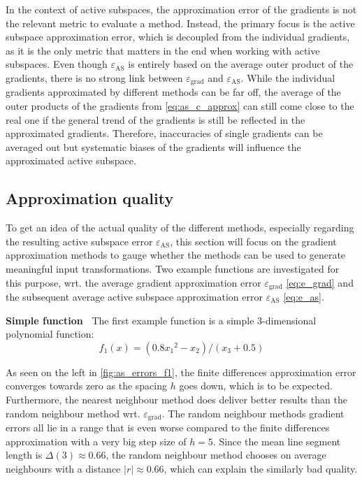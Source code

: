 \documentclass[
  a4paper,  %
  twoside,  %
  bibliography=totoc,
  headsepline,
  cleardoublepage=empty,
  parskip=half,
  draft=false
]{scrbook}
\begin{document}
In the context of active subspaces, the approximation error of the gradients is not the relevant metric to evaluate a method.
Instead, the primary focus is the active subspace approximation error, which is decoupled from the individual gradients, as it is the only metric that matters in the end when working with active subspaces.
Even though $\varepsilon_{\text{AS}}$ is entirely based on the average outer product of the gradients, there is no strong link between $\varepsilon_{\text{grad}}$ and $\varepsilon_{\text{AS}}$.
While the individual gradients approximated by different methods can be far off, the average of the outer products of the gradients from \cref{eq:as_c_approx} can still come close to the real one if the general trend of the gradients is still be reflected in the approximated gradients.
Therefore, inaccuracies of single gradients can be averaged out but systematic biases of the gradients will influence the approximated active subspace.

\subsection{Approximation quality}

To get an idea of the actual quality of the different methods, especially regarding the resulting active subspace error $\varepsilon_{\text{AS}}$, this section will focus on the gradient approximation methods to gauge whether the methods can be used to generate meaningful input transformations.
Two example functions are investigated for this purpose, wrt. the average gradient approximation error $\varepsilon_{\text{grad}}$ \cref{eq:e_grad} and the subsequent average active subspace approximation error $\varepsilon_{\text{AS}}$ \cref{eq:e_as}.

\vspace{2mm}
\textbf{Simple function~}
The first example function is a simple $3$-dimensional polynomial function:
\begin{equation}
f_1(x)=(0.8 {x_1}^2 - x_2) / (x_3 + 0.5)
\nonumber
\end{equation}

As seen on the left in \cref{fig:as_errors_f1}, the finite differences approximation error converges towards zero as the spacing $h$ goes down, which is to be expected.
Furthermore, the nearest neighbour method does deliver better results than the random neighbour method wrt. $\varepsilon_{\text{grad}}$.
The random neighbour methods gradient errors all lie in a range that is even worse compared to the finite differences approximation with a very big step size of $h=5$.
Since the mean line segment length is $\Delta(3) \approx 0.66$, the random neighbour method chooses on average neighbours with a distance $|r| \approx 0.66$, which can explain the similarly bad quality.
\end{document}
